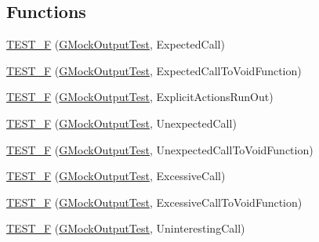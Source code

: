 \subsection*{Functions}
\begin{DoxyCompactItemize}
\item 
\mbox{\hyperlink{_obj__test_2lib_2googletest-master_2googlemock_2test_2gmock__output__test___8cc_a5cae7729bb06b3064b765a06e58c2566}{T\+E\+S\+T\+\_\+F}} (\mbox{\hyperlink{class_g_mock_output_test}{G\+Mock\+Output\+Test}}, Expected\+Call)
\item 
\mbox{\hyperlink{_obj__test_2lib_2googletest-master_2googlemock_2test_2gmock__output__test___8cc_acafecaf97c5e08925e452e670cc9c60c}{T\+E\+S\+T\+\_\+F}} (\mbox{\hyperlink{class_g_mock_output_test}{G\+Mock\+Output\+Test}}, Expected\+Call\+To\+Void\+Function)
\item 
\mbox{\hyperlink{_obj__test_2lib_2googletest-master_2googlemock_2test_2gmock__output__test___8cc_a9ea40a88b30f8b5507efbf486ac06761}{T\+E\+S\+T\+\_\+F}} (\mbox{\hyperlink{class_g_mock_output_test}{G\+Mock\+Output\+Test}}, Explicit\+Actions\+Run\+Out)
\item 
\mbox{\hyperlink{_obj__test_2lib_2googletest-master_2googlemock_2test_2gmock__output__test___8cc_a87e290b73a27f69e2352986b95a09fcb}{T\+E\+S\+T\+\_\+F}} (\mbox{\hyperlink{class_g_mock_output_test}{G\+Mock\+Output\+Test}}, Unexpected\+Call)
\item 
\mbox{\hyperlink{_obj__test_2lib_2googletest-master_2googlemock_2test_2gmock__output__test___8cc_aba5c783b0346beacc83af5ced4aeb7db}{T\+E\+S\+T\+\_\+F}} (\mbox{\hyperlink{class_g_mock_output_test}{G\+Mock\+Output\+Test}}, Unexpected\+Call\+To\+Void\+Function)
\item 
\mbox{\hyperlink{_obj__test_2lib_2googletest-master_2googlemock_2test_2gmock__output__test___8cc_afa4ca5a73e2af24d016e48ee70e10901}{T\+E\+S\+T\+\_\+F}} (\mbox{\hyperlink{class_g_mock_output_test}{G\+Mock\+Output\+Test}}, Excessive\+Call)
\item 
\mbox{\hyperlink{_obj__test_2lib_2googletest-master_2googlemock_2test_2gmock__output__test___8cc_ad8406b814788092ad25da61038706134}{T\+E\+S\+T\+\_\+F}} (\mbox{\hyperlink{class_g_mock_output_test}{G\+Mock\+Output\+Test}}, Excessive\+Call\+To\+Void\+Function)
\item 
\mbox{\hyperlink{_obj__test_2lib_2googletest-master_2googlemock_2test_2gmock__output__test___8cc_aa9159573c3f5f5bc7be3475e7398afc5}{T\+E\+S\+T\+\_\+F}} (\mbox{\hyperlink{class_g_mock_output_test}{G\+Mock\+Output\+Test}}, Uninteresting\+Call)

\end{DoxyCompactItemize}
